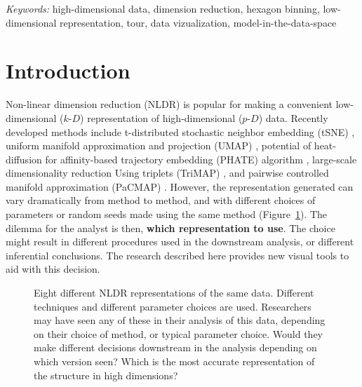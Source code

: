 \documentclass[
  12pt]{article}
\newcommand\pD{$p\text{-}D$}
\newcommand\kD{$k\text{-}D$}
\begin{document}
\noindent%
{\it Keywords:} high-dimensional data, dimension reduction, hexagon
binning, low-dimensional representation, tour, data
vizualization, model-in-the-data-space
\vfill

\newpage
{} %



\section{Introduction}\label{introduction}

Non-linear dimension reduction (NLDR) is popular for making a convenient
low-dimensional (\kD{}) representation of high-dimensional (\pD{}) data.
Recently developed methods include t-distributed stochastic neighbor
embedding (tSNE) \citep{laurens2008}, uniform manifold approximation and
projection (UMAP) \citep{leland2018}, potential of heat-diffusion for
affinity-based trajectory embedding (PHATE) algorithm \citep{moon2019},
large-scale dimensionality reduction Using triplets (TriMAP)
\citep{amid2022}, and pairwise controlled manifold approximation
(PaCMAP) \citep{yingfan2021}. However, the representation generated can
vary dramatically from method to method, and with different choices of
parameters or random seeds made using the same method
(Figure~\ref{fig-NLDR-variety}). The dilemma for the analyst is then,
\textbf{which representation to use}. The choice might result in
different procedures used in the downstream analysis, or different
inferential conclusions. The research described here provides new visual
tools to aid with this decision.

\begin{figure}


\caption{\label{fig-NLDR-variety}Eight different NLDR representations of
the same data. Different techniques and different parameter choices are
used. Researchers may have seen any of these in their analysis of this
data, depending on their choice of method, or typical parameter choice.
Would they make different decisions downstream in the analysis depending
on which version seen? Which is the most accurate representation of the
structure in high dimensions?}

\end{figure}%
\end{document}
